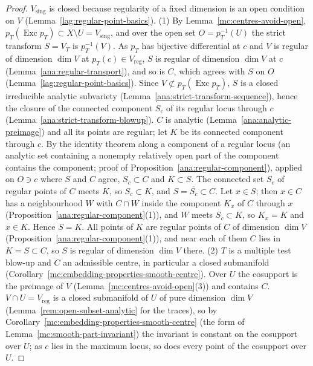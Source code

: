 \begin{proof}
\leanok
\(V_{\mathrm{sing}}\) is closed because regularity of a fixed dimension is an open condition on \(V\) (Lemma~\ref{lag:regular-point-basics}).
(1) By Lemma~\ref{mc:centres-avoid-open}, \(p_T(\operatorname{Exc}p_T)\subset X\setminus U=V_{\mathrm{sing}}\), and over the open set \(O=p_T^{-1}(U)\) the strict transform \(S=V_T\)
is \(p_T^{-1}(V)\). As \(p_T\) has bijective differential at \(c\) and \(V\) is regular of dimension \(\dim V\) at \(p_T(c)\in V_{\mathrm{reg}}\), \(S\) is regular of dimension
\(\dim V\) at \(c\) (Lemma~\ref{ana:regular-transport}), and so is \(C\), which agrees with \(S\) on \(O\) (Lemma~\ref{lag:regular-point-basics}). Since
\(V\not\subset p_T(\operatorname{Exc}p_T)\), \(S\) is a closed irreducible analytic subvariety (Lemma~\ref{ana:strict-transform-sequence}), hence the closure of the
connected component \(S_c\) of its regular locus through \(c\) (Lemma~\ref{ana:strict-transform-blowup}). \(C\) is analytic (Lemma~\ref{ana:analytic-preimage}) and all its
points are regular; let \(K\) be its connected component through \(c\). By the identity theorem along a component of a regular locus (an analytic set containing
a nonempty relatively open part of the component contains the component; proof of Proposition~\ref{ana:regular-component}), applied on \(O\ni c\) where \(S\) and
\(C\) agree, \(S_c\subset C\) and \(K\subset S\). The connected set \(S_c\) of regular points of \(C\) meets \(K\), so \(S_c\subset K\), and \(S=\overline{S_c}\subset C\).
Let \(x\in S\); then \(x\in C\) has a neighbourhood \(W\) with \(C\cap W\) inside the component \(K_x\) of \(C\) through \(x\)
(Proposition~\ref{ana:regular-component}(1)), and \(W\) meets \(S_c\subset K\), so \(K_x=K\) and \(x\in K\). Hence \(S=K\). All points of \(K\) are regular points of \(C\)
of dimension \(\dim V\) (Proposition~\ref{ana:regular-component}(1)), and near each of them \(C\) lies in \(K=S\subset C\), so \(S\) is regular of dimension \(\dim V\) there.
(2) \(T\) is a multiple test blow-up and \(C\) an admissible centre, in particular a closed submanifold (Corollary~\ref{mc:embedding-properties-smooth-centre}).
Over \(U\) the cosupport is the preimage of \(V\) (Lemma~\ref{mc:centres-avoid-open}(3)) and contains \(C\). \(V\cap U=V_{\mathrm{reg}}\) is a closed submanifold of \(U\) of pure
dimension \(\dim V\) (Lemma~\ref{rem:open-subset-analytic} for the traces), so by Corollary~\ref{mc:embedding-properties-smooth-centre} (the form of
Lemma~\ref{mc:smooth-part-invariant}) the invariant is constant on the cosupport over \(U\); as \(c\) lies in the maximum locus, so does every point of the cosupport
over \(U\).
\end{proof}

